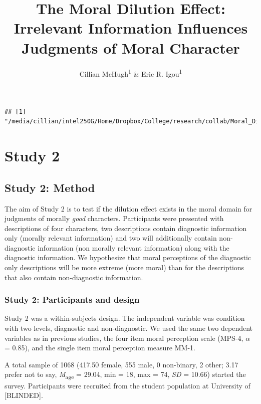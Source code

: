 \documentclass[
  english,
  man,floatsintext]{apa7}
\title{The Moral Dilution Effect: Irrelevant Information Influences Judgments of Moral Character}
\author{Cillian McHugh\textsuperscript{1} \& Eric R. Igou\textsuperscript{1}}
\date{}
\affiliation{\vspace{0.5cm}\textsuperscript{1} University of Limerick}
\begin{document}
\maketitle

\begin{verbatim}
## [1] "/media/cillian/intel250G/Home/Dropbox/College/research/collab/Moral_Dilution/moral_dilution_online/manuscript_prep"
\end{verbatim}

\hypertarget{study-2}{%
\section{Study 2}\label{study-2}}

\hypertarget{study-2-method}{%
\subsection{Study 2: Method}\label{study-2-method}}

The aim of Study 2 is to test if the dilution effect exists in the moral domain for judgments of morally \emph{good} characters. Participants were presented with descriptions of four characters, two descriptions contain diagnostic information only (morally relevant information) and two will additionally contain non-diagnostic information (non morally relevant information) along with the diagnostic information. We hypothesize that moral perceptions of the diagnostic only descriptions will be more extreme (more moral) than for the descriptions that also contain non-diagnostic information.

\hypertarget{study-2-participants-and-design}{%
\subsubsection{Study 2: Participants and design}\label{study-2-participants-and-design}}

Study 2 was a within-subjects design. The independent variable was condition with two levels, diagnostic and non-diagnostic. We used the same two dependent variables as in previous studies, the four item moral perception scale (MPS-4, \(\alpha\) = 0.85), and the single item moral perception measure MM-1.

A total sample of 1068 (417.50 female, 555 male, 0 non-binary, 2 other; 3.17 prefer not to say, \emph{M}\textsubscript{age} = 29.04, min = 18, max = 74, \emph{SD} = 10.66) started the survey. Participants were recruited from the student population at University of {[}BLINDED{]}.
\end{document}
